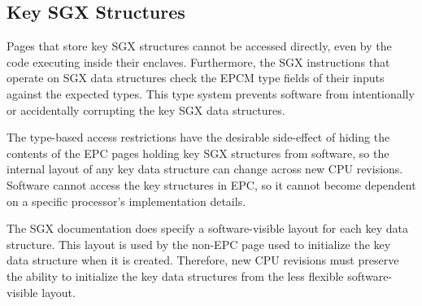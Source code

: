 

\subsection{Key SGX Structures}
\label{sec:key_structures}


Pages that store key SGX structures cannot be accessed directly, even by the
code executing inside their enclaves. Furthermore, the SGX instructions that
operate on SGX data structures check the EPCM type fields of their inputs
against the expected types. This type system prevents software from
intentionally or accidentally corrupting the key SGX data structures.

The type-based access restrictions have the desirable side-effect of hiding the
contents of the EPC pages holding key SGX structures from software, so the
internal layout of any key data structure can change across new CPU revisions.
Software cannot access the key structures in EPC, so it cannot become dependent
on a specific processor's implementation details.

The SGX documentation does specify a software-visible layout for each key data
structure. This layout is used by the non-EPC page used to initialize the key
data structure when it is created. Therefore, new CPU revisions must preserve
the ability to initialize the key data structures from the less flexible
software-visible layout.

